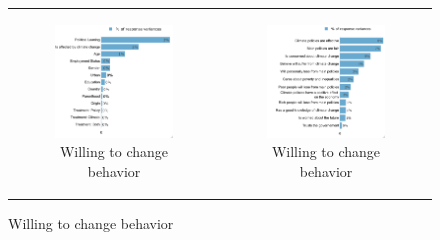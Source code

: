 \documentclass{article}
\begin{document}
\begin{figure}[h!]
\begin{center}
	\begin{tabular}{cc}
		\begin{subfigure}{0.5\textwidth}
		\caption{Willing to change behavior}
			\includegraphics[width=\textwidth]{lmg_willing_change_socio_non_standardized}
		\end{subfigure}&
		\begin{subfigure}{0.5\textwidth}
		\caption{Willing to change behavior}
			\includegraphics[width=\textwidth]{lmg_willing_change_indices_non_standardized}
		\end{subfigure}\\
	\end{tabular}
\end{center}
\end{figure}
\end{document}
